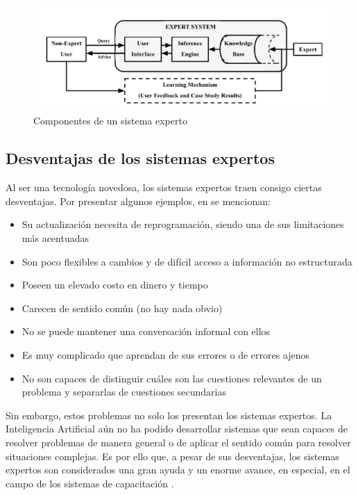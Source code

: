 \begin{figure}[h]
\centering
 \includegraphics[width=0.9\linewidth]{imagen/componentes.png}
 \caption{Componentes de un sistema experto}
 \label{fig:componentes} 
\end{figure}

\subsection{Desventajas de los sistemas expertos}
Al ser una tecnología novedosa, los sistemas expertos traen consigo ciertas desventajas. Por presentar algunos ejemplos, en \cite{Kandula2020} se mencionan:

\begin{itemize}
\item Su actualización necesita de reprogramación, siendo una de sus limitaciones más acentuadas
\item Son poco flexibles a cambios y de difícil acceso a información no estructurada
\item Poseen un elevado costo en dinero y tiempo
\item Carecen de sentido común (no hay nada obvio)
\item No se puede mantener una conversación informal con ellos
\item Es muy complicado que aprendan de sus errores o de errores ajenos
\item No son capaces de distinguir cuáles son las cuestiones relevantes de un
problema y separarlas de cuestiones secundarias
\end{itemize}

Sin embargo, estos problemas no solo los presentan los sistemas expertos. La Inteligencia Artificial aún no ha podido desarrollar sistemas que
sean capaces de resolver problemas de manera general o de aplicar el sentido común para resolver situaciones complejas. Es por ello que, a pesar de sus desventajas, los sistemas expertos son considerados una gran ayuda y un enorme avance, en especial, en el campo de los sistemas de capacitación \cite{Barham2022}.

